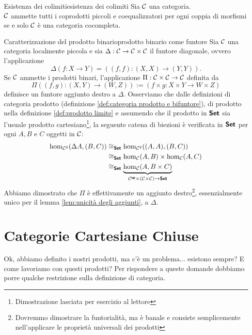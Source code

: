 \documentclass{article}
\renewcommand\C{\mc{C}}
\begin{document}
\begin{corollary}{Esistenza dei colimiti}{esistenza dei colimiti}{
    Sia $\C$ una categoria.\\
    $\C$ ammette tutti i coprodotti piccoli e coequalizzatori per ogni coppia di morfismi se e solo $\C$ è una categoria cocompleta.
}
\begin{theorem}{Caratterizzazione del prodotto binario}{prodotto binario come funtore}
    Sia $\C$ una categoria localmente piccola e sia $\Delta :\C\to\C\times\C$ il funtore diagonale, ovvero l'applicazione
    \[ \Delta( f:X\to Y ) = ((f,f):(X,X)\to(Y,Y)).\]
    Se $\C$ ammette i prodotti binari, l'applicazione $\Pi : \C\times\C \to \C$ definita da
    \[\Pi((f,g):(X,Y)\to(W,Z)) := (f\times g : X\times Y \to W\times Z) \]
    definisce un funtore aggiunto destro a $\Delta$.
    \proof
    Osserviamo che dalle definizioni di categoria prodotto (definizione \ref{def:categoria prodotto e bifuntore}), di prodotto nella definizione \ref{def:prodotto limite} e assumendo che il prodotto in $\text{\sffamily\textbf{Set}}$ sia l'usuale prodotto cartesiano\footnote{Dimostrazione lasciata per esercizio al lettore}, la seguente catena di biezioni è verificata in $\text{\sffamily\textbf{Set}}$ per ogni $A,B$ e $C$ oggetti in $\C$:
    \[\begin{aligned}
        \hom_{\C^2}(\Delta A,(B,C)) & \cong_\setcat \hom_{\C^2}((A,A),(B,C))\\
        & \cong_\setcat \hom_\C(A,B)\times \hom_\C(A,C)\\
        & \cong_\setcat \underbrace{\hom_\C(A, B\times C)}_{\C^\op \times (\C\times\C) \to \setcat}
    \end{aligned} \]
    Abbiamo dimostrato che $\Pi$ è effettivamente un aggiunto destro\footnote{Dovremmo dimostrare la funtorialità, ma è banale e consiste semplicemente nell'applicare le proprietà universali dei prodotti}, essenzialmente unico per il lemma \ref{lem:unicità degli aggiunti}, a $\Delta$.
\end{theorem}

\pagebreak

\section{Categorie Cartesiane Chiuse}

Ok, abbiamo definito i nostri prodotti, ma c'è un problema... esistono sempre? E come lavoriamo con questi prodotti? Per rispondere a queste domande dobbiamo porre qualche restrizione sulla definizione di categoria.


\end{corollary}
\end{document}

